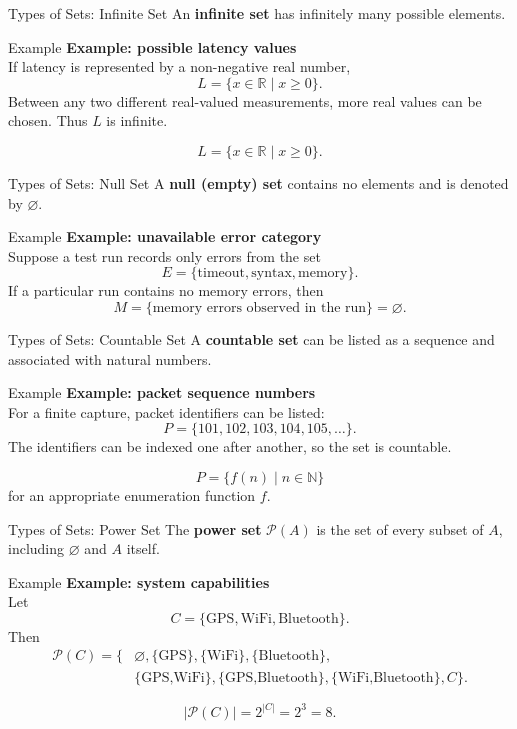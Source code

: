 \documentclass[aspectratio=169,11pt]{beamer}
\newcommand{\examplebox}[2]{
\begin{block}{Example}
\textbf{#1}\\[-1mm]
#2
\end{block}
}
\begin{document}
\begin{frame}{Types of Sets: Infinite Set}
An \textbf{infinite set} has infinitely many possible elements.

\examplebox{Example: possible latency values}{
If latency is represented by a non-negative real number,
\[
L=\{x\in\mathbb{R}\mid x\ge 0\}.
\]
Between any two different real-valued measurements, more real values can be chosen. Thus $L$ is infinite.
}

\[
L=\{x\in\mathbb{R}\mid x\ge 0\}.
\]
\end{frame}

\begin{frame}{Types of Sets: Null Set}
A \textbf{null (empty) set} contains no elements and is denoted by $\varnothing$.

\examplebox{Example: unavailable error category}{
Suppose a test run records only errors from the set
\[
E=\{\text{timeout},\text{syntax},\text{memory}\}.
\]
If a particular run contains no memory errors, then
\[
M=\{\text{memory errors observed in the run}\}=\varnothing.
\]
}
\end{frame}

\begin{frame}{Types of Sets: Countable Set}
A \textbf{countable set} can be listed as a sequence and associated with natural numbers.

\examplebox{Example: packet sequence numbers}{
For a finite capture, packet identifiers can be listed:
\[
P=\{101,102,103,104,105,\ldots\}.
\]
The identifiers can be indexed one after another, so the set is countable.
}

\[
P=\{f(n)\mid n\in\mathbb{N}\}
\]
for an appropriate enumeration function $f$.
\end{frame}

\begin{frame}{Types of Sets: Power Set}
The \textbf{power set} $\mathcal{P}(A)$ is the set of every subset of $A$, including $\varnothing$ and $A$ itself.

\examplebox{Example: system capabilities}{
Let
\[
C=\{\text{GPS},\text{WiFi},\text{Bluetooth}\}.
\]
Then
\[
\begin{aligned}
\mathcal{P}(C)=\{&
\varnothing,\{\text{GPS}\},\{\text{WiFi}\},\{\text{Bluetooth}\},\\
&\{\text{GPS,WiFi}\},\{\text{GPS,Bluetooth}\},
\{\text{WiFi,Bluetooth}\},C\}.
\end{aligned}
\]
}

\[
\boxed{|\mathcal{P}(C)|=2^{|C|}=2^3=8}.
\]
\end{frame}
\end{document}
